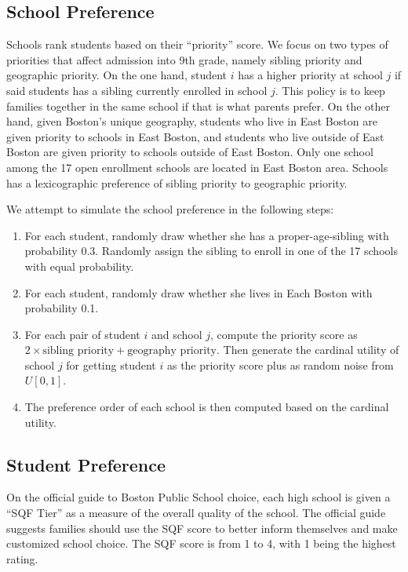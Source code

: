 \documentclass{article}
\begin{document}
\subsection{School Preference}
Schools rank students based on their ``priority'' score. We focus on two types of priorities that affect admission into 9th grade, namely sibling priority and geographic priority. On the one hand, student $i$ has a higher priority at school $j$ if said students has a sibling currently enrolled in school $j$. This policy is to keep families together in the same school if that is what parents prefer. On the other hand, given Boston's unique geography, students who live in East Boston are given priority to schools in East Boston, and students who live outside of East Boston are given priority to schools outside of East Boston. Only one school among the 17 open enrollment schools are located in East Boston area. Schools has a lexicographic preference of sibling priority to geographic priority. 

We attempt to simulate the school preference in the following steps:
\begin{enumerate}
  \item For each student, randomly draw whether she has a proper-age-sibling with probability 0.3. Randomly assign the sibling to enroll in one of the 17 schools with equal probability. 
  \item For each student, randomly draw whether she lives in Each Boston with probability 0.1.
  \item For each pair of student $i$ and school $j$, compute the priority score as $2\times \text{sibling priority} + \text{geography priority}$. Then generate the cardinal utility of school $j$ for getting student $i$ as the priority score plus as random noise from $U[0,1]$. 
  \item The preference order of each school is then computed based on the cardinal utility. 
\end{enumerate}

\subsection{Student Preference}
On the official guide to Boston Public School choice, each high school is given a ``SQF Tier'' as a measure of the overall quality of the school. The official guide suggests families should use the SQF score to better inform themselves and make customized school choice. The SQF score is from 1 to 4, with 1 being the highest rating. 
\end{document}
